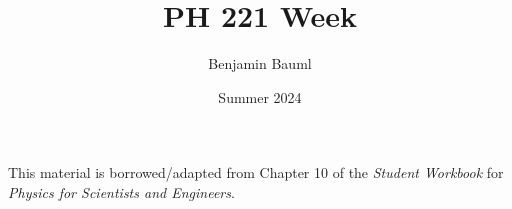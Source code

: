 \documentclass[]{article}
\title{PH 221 Week \Week}
\author{Benjamin Bauml}
\date{Summer 2024}
\newcommand{\FileDepth}{../../..}
\begin{document}
\maketitle
\begin{center}
	This material is borrowed/adapted from Chapter 10 of the \textit{Student Workbook} for \textit{Physics for Scientists and Engineers}.
\end{center}





\end{document}
